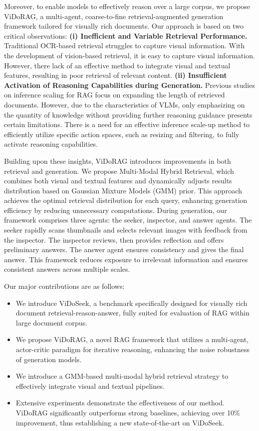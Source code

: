 Moreover, to enable models to effectively reason over a large corpus, we propose ViDoRAG, a multi-agent, coarse-to-fine retrieval-augmented generation framework tailored for visually rich documents. Our approach is based on two critical observations:
\textbf{(i) Inefficient and Variable Retrieval Performance.} 
Traditional OCR-based retrieval struggles to capture visual information. With the development of vision-based retrieval, it is easy to capture visual information\cite{faysse2024colpali,yu2024visrag,zhai2023sigmoid}. However, there lack of an effective method to integrate visual and textual features, resulting in poor retrieval of relevant content.
\textbf{(ii) Insufficient Activation of Reasoning Capabilities during Generation.} 
Previous studies on inference scaling for RAG focus on expanding the length of retrieved documents\cite{jiang2024longrag,shao2025scaling,xu2023retrieval}. However, due to the characteristics of VLMs, only emphasizing on the quantity of knowledge without providing further reasoning guidance presents certain limitations. There is a need for an effective inference scale-up method to efficiently utilize specific action spaces, such as resizing and filtering, to fully activate reasoning capabilities.

Building upon these insights, ViDoRAG introduces improvements in both retrieval and generation. We propose Multi-Modal Hybrid Retrieval, which combines both visual and textual features and dynamically adjusts results distribution based on Gaussian Mixture Models (GMM) prior. This approach achieves the optimal retrieval distribution for each query, enhancing generation efficiency by reducing unnecessary computations.
During generation, our framework comprises three agents: the seeker, inspector, and answer agents. The seeker rapidly scans thumbnails and selects relevant images with feedback from the inspector. The inspector reviews, then provides reflection and offers preliminary answers. The answer agent ensures consistency and gives the final answer. This framework reduces exposure to irrelevant information and ensures consistent answers across multiple scales.

Our major contributions are as follows:
\begin{itemize}
    \item We introduce ViDoSeek, a benchmark specifically designed for visually rich document retrieval-reason-answer, fully suited for evaluation of RAG within large document corpus.
    \item We propose ViDoRAG, a novel RAG framework that utilizes a multi-agent, actor-critic paradigm for iterative reasoning, enhancing the noise robustness of generation models. 
    \item We introduce a GMM-based multi-modal hybrid retrieval strategy to effectively integrate visual and textual pipelines.
    \item Extensive experiments demonstrate the effectiveness of our method. ViDoRAG significantly outperforms strong baselines, achieving over 10\% improvement, thus establishing a new state-of-the-art on ViDoSeek.
\end{itemize}